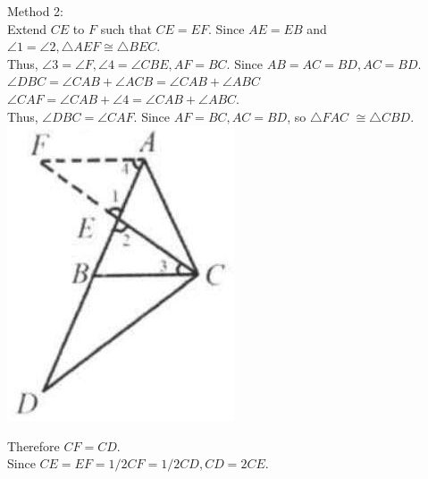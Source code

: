 \documentclass[10pt]{article}
\begin{document}
Method 2:\\
Extend \(C E\) to \(F\) such that \(C E=E F\). Since \(A E=E B\) and \(\angle 1=\angle 2, \triangle A E F \cong \triangle B E C\).\\
Thus, \(\angle 3=\angle F, \angle 4=\angle C B E, A F=B C\). Since \(A B=A C=B D, A C=B D\).\\
\(\angle D B C=\angle C A B+\angle A C B=\angle C A B+\angle A B C\)\\
\(\angle C A F=\angle C A B+\angle 4=\angle C A B+\angle A B C\).\\
Thus, \(\angle D B C=\angle C A F\). Since \(A F=B C, A C=B D\), so \(\triangle F A C\) \(\cong \triangle C B D\).\\
\includegraphics[max width=\textwidth, center]{2025_04_17_97bc1f7e44d93c271a88g-030(2)}

Therefore \(C F=C D\).\\
Since \(C E=E F=1 / 2 C F=1 / 2 C D, C D=2 C E\).
\end{document}
